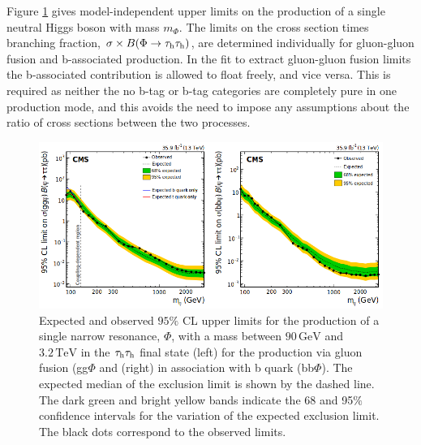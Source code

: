 Figure \ref{fig:xslimits} gives model-independent upper limits on the production of a single neutral Higgs boson with mass $m_{\Phi}$. The limits on the cross section times branching fraction, $\sigma\times B(\Phi\rightarrow\tau_{\rm h}\tau_{\rm h})$, are determined individually for gluon-gluon fusion and b-associated production. In the fit to extract gluon-gluon fusion limits the b-associated contribution is allowed to float freely, and vice versa. This is required as neither the no b-tag or b-tag categories are completely pure in one production mode, and this avoids the need to impose any assumptions about the ratio of cross sections between the two processes.

\begin{figure}
    \centering
    \includegraphics[width=\textwidth]{Images/xslimitsMSSM.png}
    \caption{Expected and observed $95\%$ CL upper limits for the production of a single narrow resonance, $\Phi$, with a mass between $90\,\mathrm{GeV}$ and $3.2\,\mathrm{TeV}$ in the $\tau_{\rm h}\tau_{\rm h}$ final state (left) for the production via gluon fusion (gg$\Phi$ and (right) in association with b quark (bb$\Phi$). The expected median of the exclusion limit is shown by the dashed line. The dark green and bright yellow bands indicate the 68 and 95$\%$ confidence intervals for the variation of the expected exclusion limit. The black dots correspond to the observed limits.}
    \label{fig:xslimits}
\end{figure}

